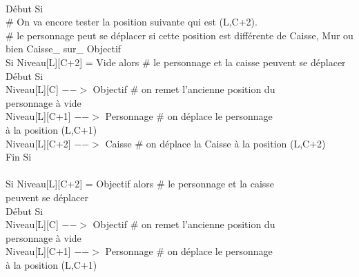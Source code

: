 \documentclass{article}
\begin{document}
\begin{tabbing}
\\	\hspace{3cm}	Début Si
\\	\hspace{4cm}		\# On va encore tester la position suivante qui est (L,C+2). 
\\	\hspace{4cm}		\# le personnage peut se déplacer si cette position est différente de Caisse,
\hspace{4cm} Mur ou bien Caisse\_ sur\_ Objectif
\\	\hspace{4cm}		Si Niveau[L][C+2] = Vide alors          \# le personnage et la caisse peuvent se déplacer
\\	\hspace{4cm}		Début Si
\\	\hspace{5cm}			Niveau[L][C] $-->$ Objectif 	\# on remet l'ancienne position du
\\ \hspace{5cm} personnage à vide
\\	\hspace{5cm}			Niveau[L][C+1] $-->$ Personnage	\# on déplace le personnage
\\ \hspace{5cm} à la position (L,C+1)
\\	\hspace{5cm}			Niveau[L][C+2] $-->$ Caisse	\# on déplace la Caisse à la position (L,C+2)
\\	\hspace{4cm}		Fin Si
\\
\\	\hspace{4cm}		Si Niveau[L][C+2] = Objectif alors         	\# le personnage et la caisse
\\ \hspace{4cm} peuvent se déplacer
\\	\hspace{4cm}		Début Si
\\	\hspace{5cm}			Niveau[L][C] $-->$ Objectif 		\# on remet l'ancienne position du
\\ \hspace{5cm} personnage à vide
\\	\hspace{5cm}			Niveau[L][C+1] $-->$ Personnage		\# on déplace le personnage
\\ \hspace{5cm} à la position (L,C+1)

\end{tabbing}
\end{document}
